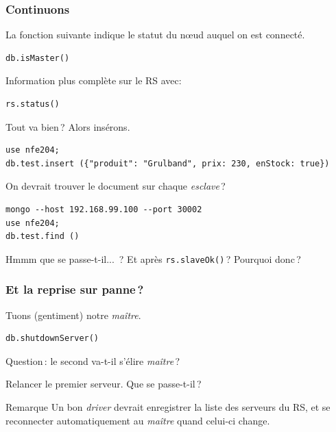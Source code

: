 \begin{frame}[fragile]
\frametitle{Continuons}

La fonction suivante indique le statut du n{\oe}ud auquel on est connecté.

\begin{verbatim}
db.isMaster()
\end{verbatim}

Information plus complète sur le RS avec:

\begin{verbatim}
rs.status()
\end{verbatim}

Tout va bien\,? Alors insérons.
\begin{verbatim}
use nfe204;
db.test.insert ({"produit": "Grulband", prix: 230, enStock: true})
\end{verbatim}

On devrait trouver le document sur chaque \textit{esclave}\,?
\begin{verbatim}
mongo --host 192.168.99.100 --port 30002
use nfe204;
db.test.find ()
\end{verbatim}

Hmmm que se passe-t-il... \,? Et après \texttt{rs.slaveOk()}\,? Pourquoi donc\,?

\end{frame}


\begin{frame}[fragile]
\frametitle{Et la reprise sur panne\,?}

Tuons (gentiment) notre \textit{maître}.

\begin{verbatim}
db.shutdownServer()
\end{verbatim}

Question\,: le second va-t-il s'élire \textit{maître}\,?

\vfill

Relancer le premier serveur. Que se passe-t-il\,?
\vfill

\begin{remblock}{Remarque}
Un bon \textit{driver} devrait enregistrer la liste des serveurs du RS, et se reconnecter
automatiquement au \textit{maître} quand celui-ci change.
\end{remblock}


\end{frame}




